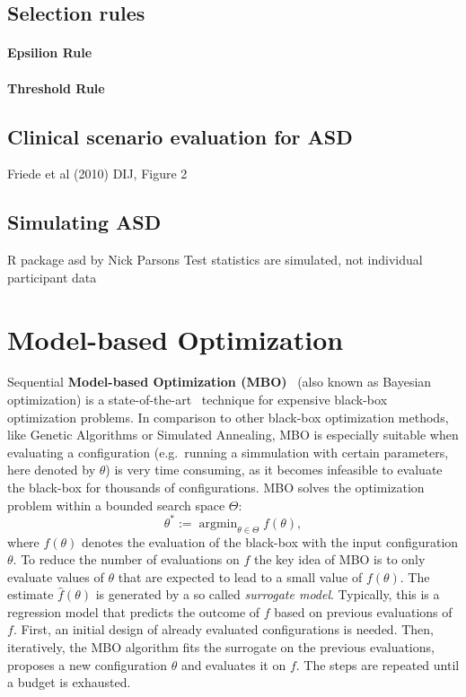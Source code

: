 \documentclass[bimj,fleqn]{w-art}
\theoremstyle{plain}
\theoremstyle{definition}
\begin{document}
\subsection{Selection rules}
\paragraph{Epsilion Rule}

\paragraph{Threshold Rule}

\subsection{Clinical scenario evaluation for ASD}
Friede et al (2010) DIJ, Figure 2

\subsection{Simulating ASD}
R package asd by Nick Parsons
Test statistics are simulated, not individual participant data

\section{Model-based Optimization}

Sequential \textbf{Model-based Optimization (MBO)}~\citep{jones_taxonomy_2001} (also known as Bayesian optimization) is a state-of-the-art~\citep{shahriari_taking_2016} technique for expensive black-box optimization problems.
In comparison to other black-box optimization methods, like Genetic Algorithms or Simulated Annealing, MBO is especially suitable when evaluating a configuration (e.g.\ running a simmulation with certain parameters, here denoted by $\theta$) is very time consuming, as it becomes infeasible to evaluate the black-box for thousands of configurations.
MBO solves the optimization problem within a bounded search space $\Theta$:
\[
\theta^\ast := \operatorname{argmin}_{\theta \in \Theta} f(\theta),
\]
where $f(\theta)$ denotes the evaluation of the black-box with the input configuration $\theta$.
To reduce the number of evaluations on $f$ the key idea of MBO is to only evaluate values of $\theta$ that are expected to lead to a small value of $f(\theta)$.
The estimate $\hat{f}(\theta)$ is generated by a so called \emph{surrogate model}.
Typically, this is a regression model that predicts the outcome of $f$ based on previous evaluations of $f$.
First, an initial design of already evaluated configurations is needed.
Then, iteratively, the MBO algorithm fits the surrogate on the previous evaluations, proposes a new configuration $\theta$ and evaluates it on $f$.
The steps are repeated until a budget is exhausted.
\end{document}

